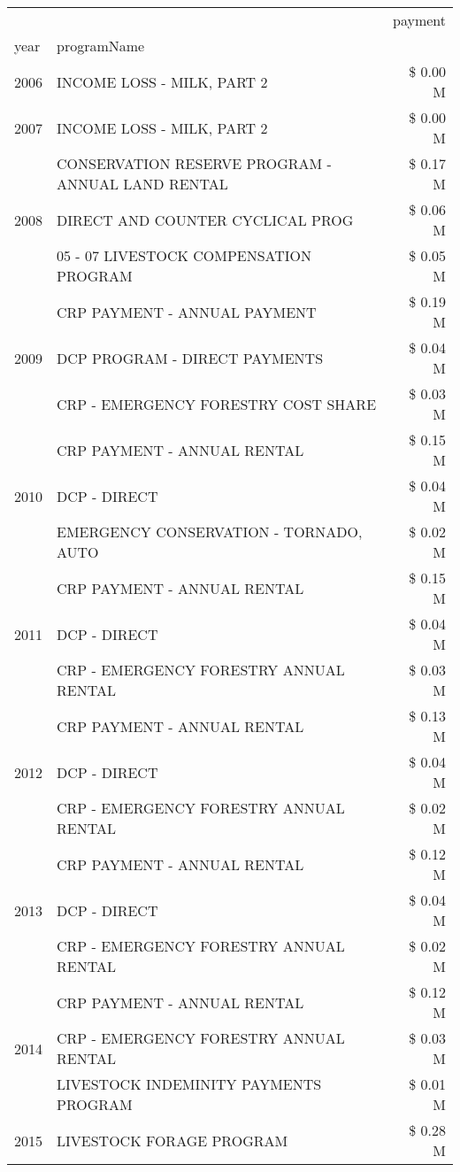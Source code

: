 \begin{tabular}{llr}
\toprule
 &  & payment \\
year & programName &  \\
\midrule
2006 & INCOME LOSS - MILK, PART 2 & \$ 0.00 M \\
\cline{1-3}
2007 & INCOME LOSS - MILK, PART 2 & \$ 0.00 M \\
\cline{1-3}
\multirow[t]{3}{*}{2008} & CONSERVATION RESERVE PROGRAM - ANNUAL LAND RENTAL & \$ 0.17 M \\
 & DIRECT AND COUNTER CYCLICAL PROG & \$ 0.06 M \\
 & 05 - 07 LIVESTOCK COMPENSATION PROGRAM & \$ 0.05 M \\
\cline{1-3}
\multirow[t]{3}{*}{2009} & CRP PAYMENT - ANNUAL PAYMENT & \$ 0.19 M \\
 & DCP PROGRAM - DIRECT PAYMENTS & \$ 0.04 M \\
 & CRP - EMERGENCY FORESTRY COST SHARE & \$ 0.03 M \\
\cline{1-3}
\multirow[t]{3}{*}{2010} & CRP PAYMENT - ANNUAL RENTAL & \$ 0.15 M \\
 & DCP - DIRECT & \$ 0.04 M \\
 & EMERGENCY CONSERVATION - TORNADO, AUTO & \$ 0.02 M \\
\cline{1-3}
\multirow[t]{3}{*}{2011} & CRP PAYMENT - ANNUAL RENTAL & \$ 0.15 M \\
 & DCP - DIRECT & \$ 0.04 M \\
 & CRP - EMERGENCY FORESTRY ANNUAL RENTAL & \$ 0.03 M \\
\cline{1-3}
\multirow[t]{3}{*}{2012} & CRP PAYMENT - ANNUAL RENTAL & \$ 0.13 M \\
 & DCP - DIRECT & \$ 0.04 M \\
 & CRP - EMERGENCY FORESTRY ANNUAL RENTAL & \$ 0.02 M \\
\cline{1-3}
\multirow[t]{3}{*}{2013} & CRP PAYMENT - ANNUAL RENTAL & \$ 0.12 M \\
 & DCP - DIRECT & \$ 0.04 M \\
 & CRP - EMERGENCY FORESTRY ANNUAL RENTAL & \$ 0.02 M \\
\cline{1-3}
\multirow[t]{3}{*}{2014} & CRP PAYMENT - ANNUAL RENTAL & \$ 0.12 M \\
 & CRP - EMERGENCY FORESTRY ANNUAL RENTAL & \$ 0.03 M \\
 & LIVESTOCK INDEMINITY PAYMENTS PROGRAM & \$ 0.01 M \\
\cline{1-3}
\multirow[t]{3}{*}{2015} & LIVESTOCK FORAGE PROGRAM & \$ 0.28 M \\

\end{tabular}
